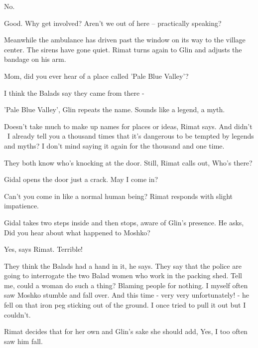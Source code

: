 \documentclass[12pt]{book}
\begin{document}
{\textquotedbl}No.{\textquotedbl}

{\textquotedbl}Good. Why get involved? Aren't we out of here -- practically speaking?{\textquotedbl}

Meanwhile the ambulance has driven past the window on its way to the village center. The sirens have gone quiet. Rimat
turns again to Glin and adjusts the bandage on his arm.

{\textquotedbl}Mom, did you ever hear of a place called 'Pale Blue Valley'?{\textquotedbl}

{\textquotedbl}I think the Balads say they came from there -{\textquotedbl}

{\textquotedbl}'Pale Blue Valley',{\textquotedbl} Glin repeats the name. {\textquotedbl}Sounds like a legend, a
myth.{\textquotedbl}

{\textquotedbl}Doesn't take much to make up names for places or ideas,{\textquotedbl} Rimat says. {\textquotedbl}And
didn't \ I already tell you a thousand times that it's dangerous to be tempted by legends and myths? I don't mind
saying it again for the thousand and one time.{\textquotedbl}

They both know who's knocking at the door. Still, Rimat calls out, {\textquotedbl}Who's there?{\textquotedbl}

Gidal opens the door just a crack. {\textquotedbl}May I come in?{\textquotedbl}

{\textquotedbl}Can't you come in like a normal human being?{\textquotedbl} Rimat responds with slight
impatience{. \ }

Gidal takes two steps inside and then stops, aware of Glin's presence. He asks, {\textquotedbl}Did you hear about what
happened to Moshko?{\textquotedbl}

{\textquotedbl}Yes,{\textquotedbl} says Rimat. {\textquotedbl}Terrible!{\textquotedbl}

{\textquotedbl}They think the Balads had a hand in it,{\textquotedbl} he says. {\textquotedbl}They say that the police
are going to interrogate the two Balad women who work in the packing shed. Tell me, could a woman do such a thing?
Blaming people for nothing. I myself often saw Moshko stumble and fall over. And this time - very very unfortunately! -
he fell on that iron peg sticking out of the ground. I once tried to pull it out but I couldn't.{\textquotedbl}

Rimat decides that for her own and Glin's sake she should add, {\textquotedbl}Yes, I too often saw him
fall.{\textquotedbl}
\end{document}
